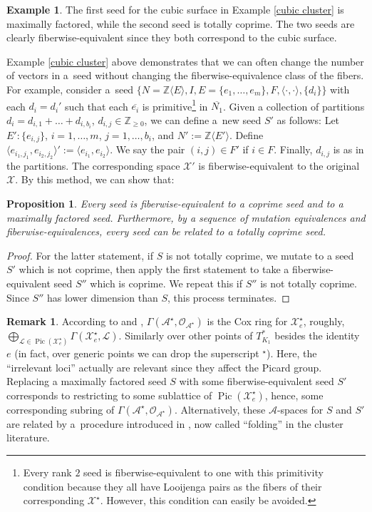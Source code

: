 \documentclass[pdftex]{sigma}
\numberwithin{equation}{section}
\numberwithin{figure}{section}
\numberwithin{table}{section}
\DeclareMathOperator{\Pic}{Pic}
\let\?=\overline
\let\bb=\mathbb
\let\s=\mathcal
\newtheorem{prop}[thm]{Proposition}
\theoremstyle{definition}
\newtheorem{eg}[thm]{Example}
\newtheorem{rmk}[thm]{Remark}
\begin{document}
\begin{eg}The first seed for the cubic surface in Example \ref{cubic cluster} is maximally factored, while the second seed is totally coprime. The two seeds are clearly fiberwise-equivalent since they both correspond to the cubic surface.
\end{eg}

 Example \ref{cubic cluster} above demonstrates that we can often change the number of vectors in a~seed without changing the fiberwise-equivalence class of the fibers. For example, consider a~seed $\{N=\bb{Z}\langle E \rangle, I,E=\{e_1,\dots,e_m\},F, \langle \cdot, \cdot \rangle, \{d_i\}\}$ with each $d_i=d_i'$ such that each $\?{e_i}$ is primitive\footnote{Every rank $2$ seed is fiberwise-equivalent to one with this primitivity condition because they all have Looijenga pairs as the fibers of their corresponding $\s{X}^{\star}$. However, this condition can easily be avoided.} in $\?{N_1}$. Given a collection of partitions $d_i=d_{i,1}+\dots+d_{i,b_i}$, $d_{i,j}\in \bb{Z}_{\geq 0}$, we can define a~new seed $S'$ as follows: Let $E'\colon \{e_{i,j}\}$, $i=1,\dots,m$, $j=1,\dots,b_i$, and $N':=\bb{Z}\langle E' \rangle$. Define $\langle e_{i_1,j_1},e_{i_2,j_2}\rangle':=\langle e_{i_1},e_{i_2}\rangle$. We say the pair $(i,j)\in F'$ if $i\in F$. Finally, $d_{i,j}$ is as in the partitions. The corresponding space $\s{X}'$ is fiberwise-equivalent to the original $\s{X}$. By this method, we can show that:
\begin{prop}\label{CoprimeEquiv}
Every seed is fiberwise-equivalent to a coprime seed and to a maximally factored seed. Furthermore, by a sequence of mutation equivalences and fiberwise-equivalences, every seed can be related to a totally coprime seed.
\end{prop}
\begin{proof}For the latter statement, if $S$ is not totally coprime, we mutate to a seed $S'$ which is not coprime, then apply the first statement to take a fiberwise-equivalent seed $S''$ which is coprime. We repeat this if $S''$ is not totally coprime. Since $S''$ has lower dimension than $S$, this process terminates.
\end{proof}

\begin{rmk}\label{Cox}According to \cite[Section~4]{GHK3} and \cite{ManCox}, $\Gamma(\s{A}^{\star},\s{O}_{\s{A}^{\star}})$ is the Cox ring for $\s{X}^{\star}_e$, roughly, $\bigoplus_{\s{L}\in \Pic(\s{X}_e^{\star})} \Gamma(\s{X}_e^{\star},\s{L})$. Similarly over other points of $T_{K_1}^*$ besides the identity $e$ (in fact, over generic points we can drop the superscript $\left.^\star\right.$). Here, the ``irrelevant loci'' actually are relevant since they affect the Picard group. Replacing a maximally factored seed $S$ with some fiberwise-equivalent seed $S'$ corresponds to restricting to some sublattice of $\Pic(\s{X}_e^{\star})$, hence, some corresponding subring of $\Gamma(\s{A}^{\star},\s{O}_{\s{A}^{\star}})$. Alternatively, these $\s{A}$-spaces for $S$ and $S'$ are related by a~procedure introduced in \cite{Dup}, now called ``folding'' in the cluster literature.
\end{rmk}
\end{document}
